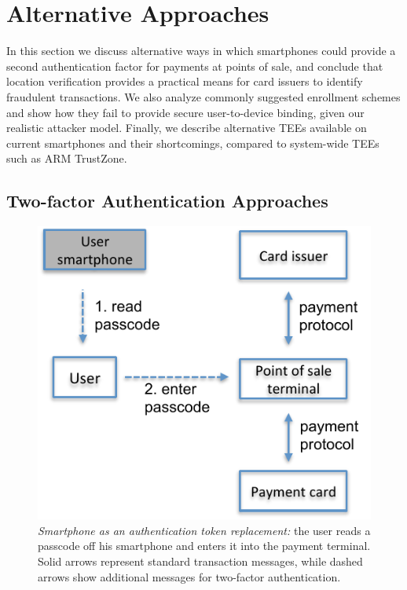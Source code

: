 \section{Alternative Approaches}
\label{sec:ps_tee_alternatives}

In this section we discuss alternative ways in which smartphones could provide a
second authentication factor for payments at points of sale, and conclude that
location verification provides a practical means for card issuers to identify
fraudulent transactions. We also analyze commonly suggested enrollment schemes
and show how they fail to provide secure user-to-device binding, given our
realistic attacker model. Finally, we describe alternative TEEs available on
current smartphones and their shortcomings, compared to system-wide TEEs such as
ARM TrustZone.

\subsection{Two-factor Authentication Approaches}
\label{sec:ps_tee_second-factor}

\begin{figure}[!ht]
  \centering
  \includegraphics[width=.5\linewidth]{figures/phonesecures/tee_second-factor-A}
  \caption[Smartphone as an authentication token replacement]{\emph{Smartphone
  as an authentication token replacement:} the user reads a passcode off his
  smartphone and enters it into the payment terminal. Solid arrows represent
  standard transaction messages, while dashed arrows show additional messages
  for two-factor authentication.}
  \label{fig:ps_tee_second-factor-A}
\end{figure}

